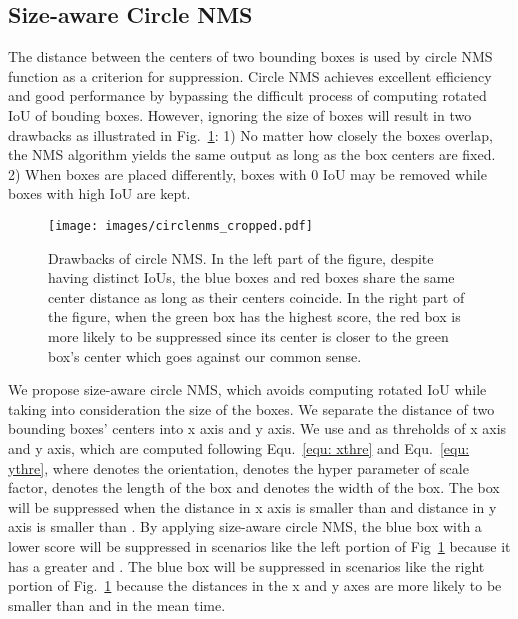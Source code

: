 \documentclass[letterpaper]{article} \usepackage[]{aaai23}  \usepackage{times}  \usepackage{helvet}  \usepackage{courier}  \usepackage[hyphens]{url}  \usepackage{graphicx} \urlstyle{rm} \def\UrlFont{\rm}  \usepackage{natbib}  \usepackage{caption} \frenchspacing  \setlength{\pdfpagewidth}{8.5in} \setlength{\pdfpageheight}{11in} \usepackage{algorithm}
\begin{document}
\subsection{Size-aware Circle NMS}
The distance between the centers of two bounding boxes is used by circle NMS ~\cite{yin2021center} function as a criterion for suppression. Circle NMS achieves excellent efficiency and good performance by bypassing the difficult process of computing rotated IoU of bouding boxes. However, ignoring the size of boxes will result in two drawbacks as illustrated in Fig.~\ref{fig:circle-nms}: 1) No matter how closely the boxes overlap, the NMS algorithm yields the same output as long as the box centers are fixed. 2) When boxes are placed differently, boxes with 0 IoU may be removed while boxes with high IoU are kept. 

\begin{figure}[t]
\texttt{[image: images/circlenms\_cropped.pdf]}
\centering
\caption{Drawbacks of circle NMS. In the left part of the figure, despite having distinct IoUs, the blue boxes and red boxes share the same center distance as long as their centers coincide. In the right part of the figure, when the green box has the highest score, the red box is more likely to be suppressed since its center is closer to the green box's center which goes against our common sense.}
\label{fig:circle-nms}
\end{figure}

We propose size-aware circle NMS, which avoids computing rotated IoU while taking into consideration the size of the boxes. We separate the distance of two bounding boxes' centers into x axis and y axis. We use  and  as threholds of x axis and y axis, which are computed following Equ.~\ref{equ: xthre} and Equ.~\ref{equ: ythre}, where  denotes the orientation,  denotes the hyper parameter of scale factor,  denotes the length of the box and  denotes the width of the box. The box will be suppressed when the distance in x axis is smaller than  and distance in y axis is smaller than . By applying size-aware circle NMS, the blue box with a lower score will be suppressed in scenarios like the left portion of Fig~\ref{fig:circle-nms} because it has a greater  and . The blue box will be suppressed in scenarios like the right portion of Fig.~\ref{fig:circle-nms} because the distances in the x and y axes are more likely to be smaller than  and  in the mean time.
\end{document}
